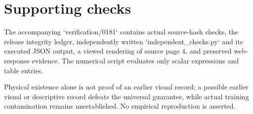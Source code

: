\documentclass[10pt]{article}
\begin{document}
\section*{Supporting checks}
The accompanying `verification/0181` contains actual source-hash checks, the release integrity ledger, independently written `independent\_checks.py` and its executed JSON output, a viewed rendering of source page 4, and preserved web-response evidence. The numerical script evaluates only scalar expressions and table entries.\par
Physical existence alone is not proof of an earlier visual record; a possible earlier visual or descriptive record defeats the universal guarantee, while actual training contamination remains unestablished. No empirical reproduction is asserted.\par
\end{document}
